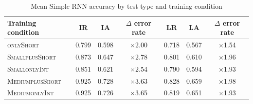 \documentclass[twoside,11pt]{article}
\newcommand{\tscx}[1]{\textsc{#1}\xspace}
\newcommand{\sm}{\tscx{Small}}
\newcommand{\med}{\tscx{Medium}}
\newcommand{\origRand}{IR\xspace}
\newcommand{\longRand}{LR\xspace}
\newcommand{\origAdv}{IA\xspace}
\newcommand{\longAdv}{LA\xspace}
\newcommand{\onlyShort}{\tscx{onlyShort}}
\newcommand{\plusShort}{\tscx{plusShort}}
\newcommand{\onlyInt}{\tscx{onlyInt}}
\begin{document}

\begin{table}[h!]
	\centering
	\begin{tabular}{lcccccc}
		\toprule
		Training condition & \origRand & \origAdv & $\Delta$ error rate & \longRand & \longAdv & $\Delta$ error rate \\
		\midrule                                                
		\onlyShort         & 0.799    & 0.598    & $\times$2.00   & 0.718    & 0.567    & $\times$1.54   \\
		\sm \plusShort     & 0.873    & 0.647    & $\times$2.78   & 0.801    & 0.610    & $\times$1.96   \\
		\sm \onlyInt       & 0.851    & 0.621    & $\times$2.54   & 0.790    & 0.594    & $\times$1.93   \\
		\med \plusShort    & 0.925    & 0.728    & $\times$3.63   & 0.828    & 0.659    & $\times$1.98   \\
		\med \onlyInt      & 0.925    & 0.726    & $\times$3.65   & 0.819    & 0.651    & $\times$1.93   \\
		\bottomrule
	\end{tabular}
	\caption{Mean Simple RNN accuracy by test type and training condition}
	\label{tab:simple-acc-test-set-by-train}
\end{table}
                  
\end{document}
